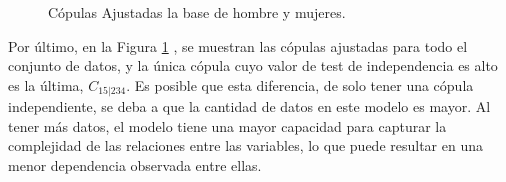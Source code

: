 \begin{figure}[H]
 \centering
    \caption{Cópulas Ajustadas la base de hombre y mujeres.}
    \label{fig:copulasTestTotal}
\end{figure}

Por último, en la Figura \ref{fig:copulasTestTotal}
, se muestran las cópulas ajustadas para todo el conjunto de datos, y la única cópula cuyo valor de test de independencia es alto es la última, $C_{15|234}$. Es posible que esta diferencia, de solo tener una cópula independiente, se deba a que la cantidad de datos en este modelo es mayor. Al tener más datos, el modelo tiene una mayor capacidad para capturar la complejidad de las relaciones entre las variables, lo que puede resultar en una menor dependencia observada entre ellas.


